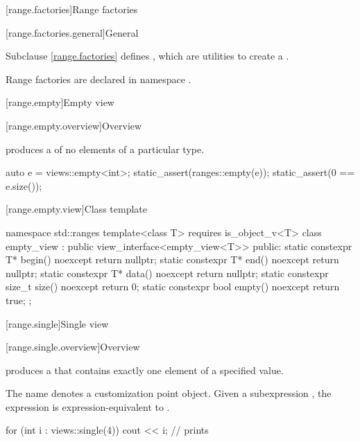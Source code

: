 [range.factories]{Range factories}

[range.factories.general]{General}

\pnum
Subclause \ref{range.factories} defines ,
which are utilities to create a .

\pnum
Range factories are declared in namespace .

[range.empty]{Empty view}

[range.empty.overview]{Overview}

\pnum
{} produces a  of no elements of
a particular type.

\pnum
\begin{example}
\begin{codeblock}
auto e = views::empty<int>;
static_assert(ranges::empty(e));
static_assert(0 == e.size());
\end{codeblock}
\end{example}

[range.empty.view]{Class template }

%
\begin{codeblock}
namespace std::ranges {
  template<class T>
    requires is_object_v<T>
  class empty_view : public view_interface<empty_view<T>> {
  public:
    static constexpr T* begin() noexcept { return nullptr; }
    static constexpr T* end() noexcept { return nullptr; }
    static constexpr T* data() noexcept { return nullptr; }
    static constexpr size_t size() noexcept { return 0; }
    static constexpr bool empty() noexcept { return true; }
  };
}
\end{codeblock}

[range.single]{Single view}

[range.single.overview]{Overview}

\pnum
{} produces a  that contains
exactly one element of a specified value.

\pnum
{}%
The name  denotes a
customization point object.
Given a subexpression , the expression
 is expression-equivalent to
.

\pnum
\begin{example}
\begin{codeblock}
for (int i : views::single(4))
  cout << i;        // prints 
\end{codeblock}
\end{example}

